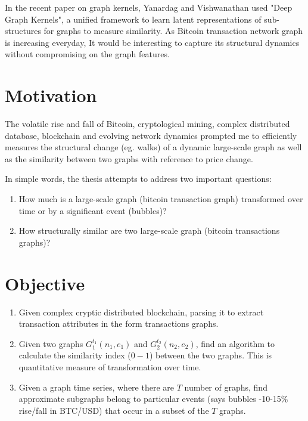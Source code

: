 In the recent paper on graph kernels, Yanardag and Vishwanathan \citep{Yanardag2015} used "Deep Graph Kernels", a unified framework to learn latent representations of sub-structures for graphs to measure similarity. As Bitcoin transaction network graph is increasing everyday, It would be interesting to capture its structural dynamics without compromising on the graph features.

\section{Motivation}
\label{sec: motivation}

The volatile rise and fall of Bitcoin, cryptological mining, complex distributed database, blockchain and evolving network dynamics prompted me to  efficiently measures the structural change (eg. walks) of a dynamic large-scale graph as well as the similarity between two graphs with reference to price change. 

In simple words, the thesis attempts to address two important questions:  
\begin{enumerate}
\item How much is a large-scale graph (bitcoin transaction graph) transformed over time or by a significant event (bubbles)?
\item How structurally similar are two large-scale graph (bitcoin transactions graphs)?
\end{enumerate}

\section{Objective}
\label{sec: objective}

\begin{enumerate}
\item Given complex cryptic distributed blockchain, parsing it to extract transaction attributes in the form transactions graphs.
\item Given two graphs $G_1^{t_1} (n_1 , e_1 )$ and $G_2^{t_2} (n_2 , e_2)$, find an algorithm to calculate the similarity index ($0-1$) between the two graphs. This is quantitative measure of transformation over time.
\item Given a graph time series, where there are $T$ number of graphs, find approximate subgraphs belong to particular events (says bubbles -10-15\% rise/fall in BTC/USD) that occur in a subset of the $T$ graphs. 
\end{enumerate}

